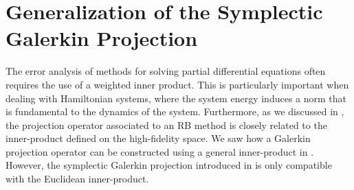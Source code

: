 
\section{Generalization of the Symplectic Galerkin Projection} \label{sec:normmor.1}

The error analysis of methods for solving partial differential equations often requires the use of a weighted inner product. This is particularly important when dealing with Hamiltonian systems, where the system energy induces a norm that is fundamental to the dynamics of the system. Furthermore, as we discussed in , the projection operator associated to an RB method is closely related to the inner-product defined on the high-fidelity space. We saw how a Galerkin projection operator can be constructed using a general inner-product in . However, the symplectic Galerkin projection introduced in  is only compatible with the Euclidean inner-product.

